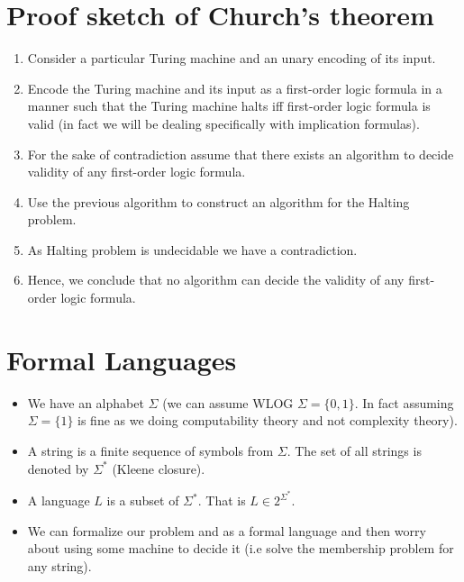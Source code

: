 \documentclass[
11pt,notheorems,hyperref={pdfauthor=whatever}
]{beamer}
\begin{document}
\section{Proof sketch of Church's theorem}
\begin{frame}
    \begin{enumerate}
        \item Consider a particular Turing machine and an unary encoding of its input.
        \item Encode the Turing machine and its input as a first-order logic formula in a manner such that the Turing machine halts iff first-order logic formula is valid (in fact we will be dealing specifically with implication formulas).
        \item For the sake of contradiction assume that there exists an algorithm to decide validity of any first-order logic formula.
        \item Use the previous algorithm to construct an algorithm for the Halting problem.
        \item As Halting problem is undecidable we have a contradiction.
        \item Hence, we conclude that no algorithm can decide the validity of any first-order logic formula.
    \end{enumerate}
\end{frame}


\section{Formal Languages}
\begin{frame}
\begin{itemize}
    \item We have an alphabet $\Sigma$ (we can assume WLOG $\Sigma = \{0, 1\}$. In fact assuming $\Sigma = \{1\}$ is fine as we doing computability theory and not complexity theory).
    \item A string is a finite sequence of symbols from $\Sigma$. The set of all strings is denoted by $\Sigma^*$ (Kleene closure).
    \item A language $L$ is a subset of $\Sigma^*$. That is $L \in 2^{\Sigma^*}$.
    \item We can formalize our problem and as a formal language and then worry about using some machine to decide it (i.e solve the membership problem for any string).
\end{itemize}
\end{frame}
\end{document}
